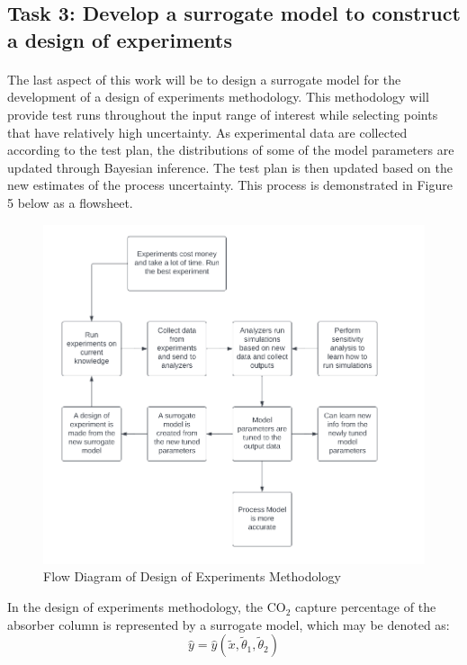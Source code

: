 \documentclass[12pt, letterpaper]{article}
\begin{document}
\subsection{Task 3: Develop a surrogate model to construct a design of experiments}

\paragraph{}
The last aspect of this work will be to design a surrogate model for the development of a design of experiments methodology. This methodology will provide test runs throughout the input range of interest while selecting points that have relatively high uncertainty. As experimental data are collected according to the test plan, the distributions of some of the model parameters are updated through Bayesian inference. The test plan is then updated based on the new estimates of the process uncertainty. This process is demonstrated in Figure 5 below as a flowsheet.

\begin{figure}[ht]
    \centering
    \includegraphics[width=14cm]{Flow Diagram.png}
    \caption{Flow Diagram of Design of Experiments Methodology}
\end{figure}

In the design of experiments methodology, the $\mathrm{CO}_2$ capture percentage of the absorber column is represented by a surrogate model, which may be denoted as:
\begin{equation}
    \hat{y}=\hat{y}\left(\tilde{x}, \tilde{\theta}_1, \tilde{\theta}_2\right)
\end{equation}
\end{document}
